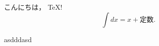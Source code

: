 \documentclass{jsarticle}
\begin{document}
こんにちは， \TeX !
\[ \int dx = x + 定数. \]

asdddasd
\end{document}
